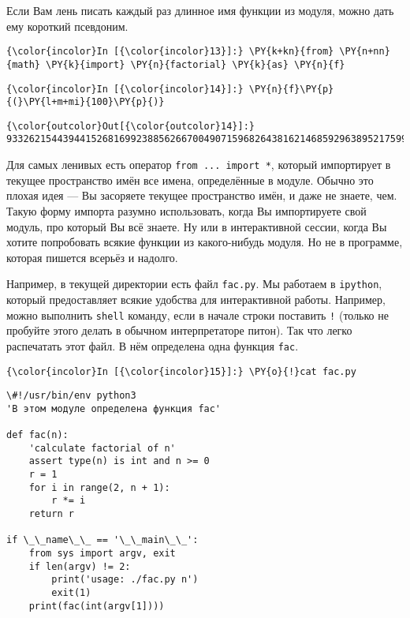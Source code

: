     Если Вам лень писать каждый раз длинное имя функции из модуля, можно
дать ему короткий псевдоним.

    \begin{Verbatim}[commandchars=\\\{\}]
{\color{incolor}In [{\color{incolor}13}]:} \PY{k+kn}{from} \PY{n+nn}{math} \PY{k}{import} \PY{n}{factorial} \PY{k}{as} \PY{n}{f}
\end{Verbatim}

    \begin{Verbatim}[commandchars=\\\{\}]
{\color{incolor}In [{\color{incolor}14}]:} \PY{n}{f}\PY{p}{(}\PY{l+m+mi}{100}\PY{p}{)}
\end{Verbatim}

            \begin{Verbatim}[commandchars=\\\{\}]
{\color{outcolor}Out[{\color{outcolor}14}]:} 93326215443944152681699238856266700490715968264381621468592963895217599993229915608941463976156518286253697920827223758251185210916864000000000000000000000000
\end{Verbatim}
        
    Для самых ленивых есть оператор \texttt{from\ ...\ import\ *}, который
импортирует в текущее пространство имён все имена, определённые в
модуле. Обычно это плохая идея --- Вы засоряете текущее пространство имён,
и даже не знаете, чем. Такую форму импорта разумно использовать, когда
Вы импортируете свой модуль, про который Вы всё знаете. Ну или в
интерактивной сессии, когда Вы хотите попробовать всякие функции из
какого-нибудь модуля. Но не в программе, которая пишется всерьёз и
надолго.

Например, в текущей директории есть файл \texttt{fac.py}. Мы работаем в
\texttt{ipython}, который предоставляет всякие удобства для
интерактивной работы. Например, можно выполнить \texttt{shell} команду,
если в начале строки поставить \texttt{!} (только не пробуйте этого
делать в обычном интерпретаторе питон). Так что легко распечатать этот
файл. В нём определена одна функция \texttt{fac}.

    \begin{Verbatim}[commandchars=\\\{\}]
{\color{incolor}In [{\color{incolor}15}]:} \PY{o}{!}cat fac.py
\end{Verbatim}

    \begin{Verbatim}[commandchars=\\\{\}]
\#!/usr/bin/env python3
'В этом модуле определена функция fac'

def fac(n):
    'calculate factorial of n'
    assert type(n) is int and n >= 0
    r = 1
    for i in range(2, n + 1):
        r *= i
    return r

if \_\_name\_\_ == '\_\_main\_\_':
    from sys import argv, exit
    if len(argv) != 2:
        print('usage: ./fac.py n')
        exit(1)
    print(fac(int(argv[1])))

    \end{Verbatim}


